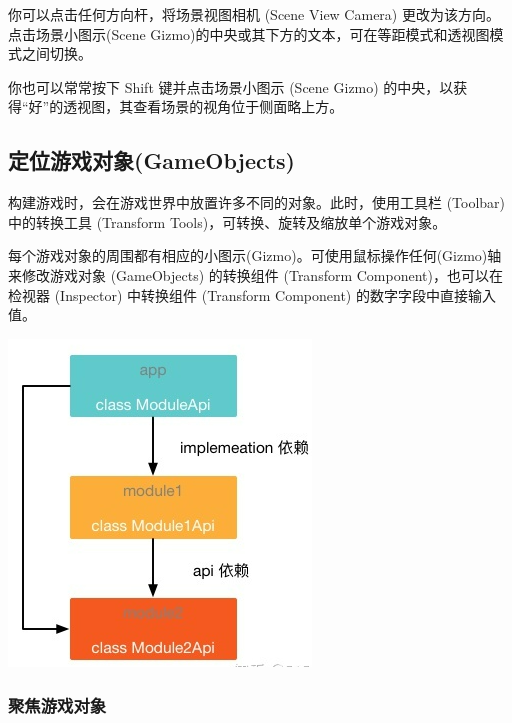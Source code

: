 \documentclass[9pt, b5paper]{article}
\begin{document}
你可以点击任何方向杆，将场景视图相机 (Scene View Camera) 更改为该方向。点击场景小图示(Scene Gizmo)的中央或其下方的文本，可在等距模式和透视图模式之间切换。

你也可以常常按下 Shift 键并点击场景小图示 (Scene Gizmo) 的中央，以获得“好”的透视图，其查看场景的视角位于侧面略上方。

\subsection{定位游戏对象(GameObjects)}
\label{sec:org54a3b1d}
构建游戏时，会在游戏世界中放置许多不同的对象。此时，使用工具栏 (Toolbar) 中的转换工具 (Transform Tools)，可转换、旋转及缩放单个游戏对象。

每个游戏对象的周围都有相应的小图示(Gizmo)。可使用鼠标操作任何(Gizmo)轴来修改游戏对象 (GameObjects) 的转换组件 (Transform Component)，也可以在检视器 (Inspector) 中转换组件 (Transform Component) 的数字字段中直接输入值。

\begin{center}
\includegraphics[width=.9\linewidth]{./pic/3.png}
\end{center}

\subsubsection{聚焦游戏对象}
\label{sec:orgcb1d6d0}
\end{document}
